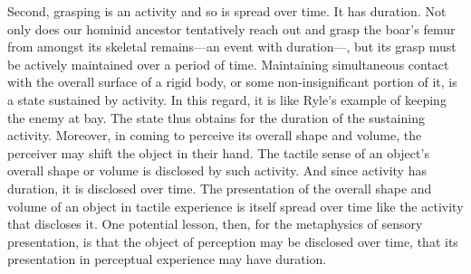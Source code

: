Second, grasping is an activity and so is spread over time. It has duration. Not only does our hominid ancestor tentatively reach out and grasp the boar's femur from amongst its skeletal remains---an event with duration---, but its grasp must be actively maintained over a period of time. Maintaining simultaneous contact with the overall surface of a rigid body, or some non-insignificant portion of it, is a state sustained by activity. In this regard, it is like Ryle's \citeyearpar[149]{Ryle:1949qr} example of keeping the enemy at bay. The state thus obtains for the duration of the sustaining activity. Moreover, in coming to perceive its overall shape and volume, the perceiver may shift the object in their hand. The tactile sense of an object's overall shape or volume is disclosed by such activity. And since activity has duration, it is disclosed over time. The presentation of the overall shape and volume of an object in tactile experience is itself spread over time like the activity that discloses it. One potential lesson, then, for the metaphysics of sensory presentation, is that the object of perception may be disclosed over time, that its presentation in perceptual experience may have duration.


